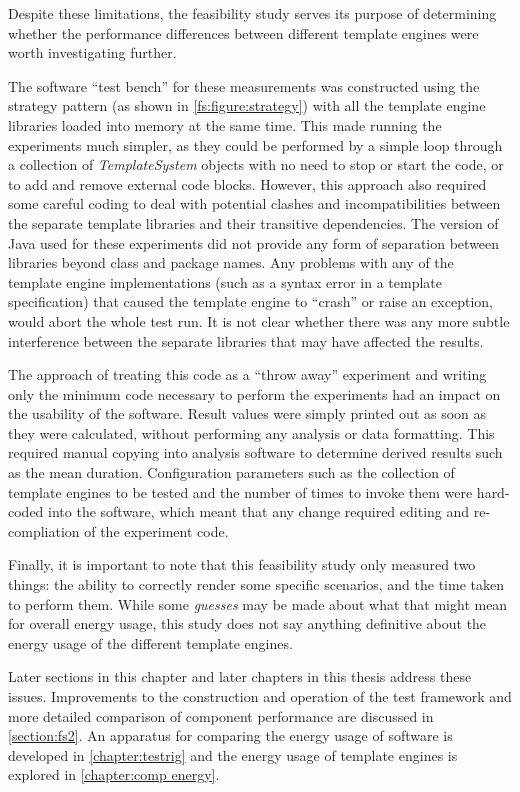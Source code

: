 Despite these limitations, the feasibility study serves its purpose of determining whether the performance differences between different \gls{template engine}s were worth investigating further.

The software \enquote{test bench} for these measurements was constructed using the strategy pattern (as shown in \autoref{fs:figure:strategy}) with all the \gls{template engine} libraries loaded into memory at the same time. This made running the experiments much simpler, as they could be performed by a simple loop through a collection of \emph{TemplateSystem} objects with no need to stop or start the code, or to add and remove external code blocks. However, this approach also required some careful coding to deal with potential clashes and incompatibilities between the separate template libraries and their transitive dependencies. The version of Java used for these experiments did not provide any form of separation between libraries beyond class and package names. Any problems with any of the \gls{template engine} implementations (such as a syntax error in a template specification) that caused the \gls{template engine} to \enquote{crash} or raise an exception, would abort the whole test run. It is not clear whether there was any more subtle interference between the separate libraries that may have affected the results.

The approach of treating this code as a \enquote{throw away} experiment and writing only the minimum code necessary to perform the experiments had an impact on the usability of the software. Result values were simply printed out as soon as they were calculated, without performing any analysis or data formatting. This required manual copying into analysis software to determine derived results such as the mean duration. Configuration parameters such as the collection of \gls{template engine}s to be tested and the number of times to invoke them were hard-coded into the software, which meant that any change required editing and re-compliation of the experiment code.

Finally, it is important to note that this feasibility study only measured two things: the ability to correctly render some specific scenarios, and the time taken to perform them. While some \emph{guesses} may be made about what that might mean for overall energy usage, this study does not say anything definitive about the energy usage of the different \gls{template engine}s.

Later sections in this chapter and later chapters in this thesis address these issues. Improvements to the construction and operation of the test framework and more detailed  comparison of component performance are discussed in \autoref{section:fs2}. An apparatus for comparing the energy usage of software is developed in \autoref{chapter:testrig} and the energy usage of template engines is explored in \autoref{chapter:comp energy}.

